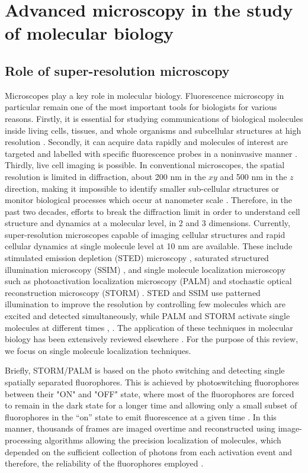 \section{Advanced microscopy in the study of molecular biology}
\subsection{Role of super-resolution microscopy }
Microscopes play a key role in molecular biology. Fluorescence microscopy in particular remain one of the most important tools for biologists for various reasons. Firstly, it is essential for studying communications of biological molecules inside living cells, tissues, and whole organisms and subcellular structures at high resolution \citep{Han2013}. Secondly, it can acquire data rapidly and molecules of interest are targeted and labelled with specific fluorescence probes in a noninvasive manner \citep{Han2013}. Thirdly, live cell imaging is possible. In conventional microscopes, the spatial resolution is limited in diffraction, about 200 nm in the $xy$ and 500 nm in the $z$ direction, making it impossible to identify smaller sub-cellular structures or monitor biological processes which occur at nanometer scale \citep{Xu2017}. Therefore, in the past two decades, efforts to break the diffraction limit in order to understand cell structure and dynamics at a molecular level, in 2 and 3 dimensions. Currently, super-resolution microscopes capable of imaging cellular structures and rapid cellular dynamics at single molecule level at 10 nm are available. These include stimulated emission depletion (STED) microscopy \citep{Klar1999}, saturated structured illumination microscopy (SSIM) \citep{Gustafsson2005}, and single molecule localization microscopy such as  photoactivation localization microscopy (PALM) \citep{Betzig2006} and stochastic optical reconstruction microscopy (STORM) \citep{Huang2008,Xu2017}. STED and SSIM use patterned illumination to improve the resolution by controlling few molecules which are excited and detected simultaneously, while PALM and STORM activate single molecules at different times \citep{Han2013}, . The application of these techniques in molecular biology has been extensively reviewed elsewhere \citep{Han2013}. For the purpose of this review, we focus on single molecule localization techniques.  

Briefly, STORM/PALM is based on the photo switching and detecting single spatially separated fluorophores. This is achieved by photoswitching  fluorophores between their  "ON" and "OFF" state, where most of the fluorophores are forced to remain in the dark state for a longer time and allowing only a small subset of fluorophores  in  the “on” state to emit fluorescence at a given time \citep{Turkowyd2016}. In this manner, thousands of frames are imaged overtime  and reconstructed using image-processing algorithms allowing the precision localization of molecules, which depended on the sufficient collection of photons from each activation event and therefore, the reliability of the fluorophores employed \citep{Turkowyd2016,Xu2017}.

